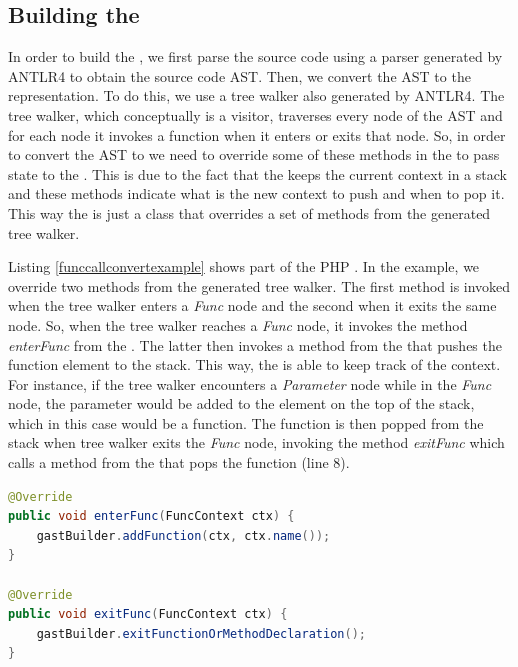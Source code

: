 \subsection{Building the \astname{}}
\label{buildgenericast}


In order to build the \astname{}, we first parse the source code using a parser generated by ANTLR4 to obtain the source code AST. Then, we convert the AST to the \astname{} representation. To do this, we use a tree walker also generated by ANTLR4. The tree walker, which conceptually is a visitor, traverses every node of the AST and for each node it invokes a function when it enters or exits that node. So, in order to convert the AST to \astname{} we need to override some of these methods in the \converter{} to pass state to the \astbuilder{}. This is due to the fact that the \astbuilder{} keeps the current context in a stack and these methods indicate what is the new context to push and when to pop it. This way the \converter{} is just a class that overrides a set of methods from the generated tree walker. 

Listing \ref{funccallconvertexample} shows part of the PHP \converter{}. In the example, we override two methods from the generated tree walker. The first method is invoked when the tree walker enters a \textit{Func} node and the second when it exits the same node. So, when the tree walker reaches a \textit{Func} node, it invokes the method \textit{enterFunc} from the \converter{}. The latter then invokes a method from the \astbuilder{} that pushes the function element to the stack. This way, the \astbuilder{} is able to keep track of the context. For instance, if the tree walker encounters a \textit{Parameter} node while in the \textit{Func} node, the parameter would be added to the element on the top of the stack, which in this case would be a function. The function is then popped from the stack when tree walker exits the \textit{Func} node, invoking the method \textit{exitFunc} which calls a method from the \astbuilder{} that pops the function (line 8). 

\begin{lstlisting}[language=Java,
    showstringspaces=false,
    caption={Function declaration example},
    label=funccallconvertexample, float]
@Override
public void enterFunc(FuncContext ctx) {
    gastBuilder.addFunction(ctx, ctx.name());
}

@Override
public void exitFunc(FuncContext ctx) {
    gastBuilder.exitFunctionOrMethodDeclaration();
}
\end{lstlisting}

